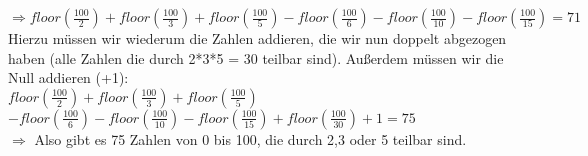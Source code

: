 \documentclass[paper = a4, ngerman]{scrartcl}
\begin{document}
	$\Rightarrow floor(\frac{100}{2}) + floor(\frac{100}{3}) +  floor(\frac{100}{5}) - floor(\frac{100}{6}) - floor(\frac{100}{10}) - floor(\frac{100}{15})= 71$\\
	
	Hierzu müssen wir wiederum die Zahlen addieren, die wir nun doppelt abgezogen haben (alle Zahlen die durch 2*3*5 = 30 teilbar sind). Außerdem müssen wir die Null addieren (+1):\\
	
		$floor(\frac{100}{2}) + floor(\frac{100}{3}) +  floor(\frac{100}{5})$\\$ - floor(\frac{100}{6}) - floor(\frac{100}{10}) - floor(\frac{100}{15}) + floor(\frac{100}{30}) + 1 = 75$\\
	
	$\Rightarrow$ Also gibt es 75 Zahlen von 0 bis 100, die durch 2,3 oder 5 teilbar sind.
\end{document}
